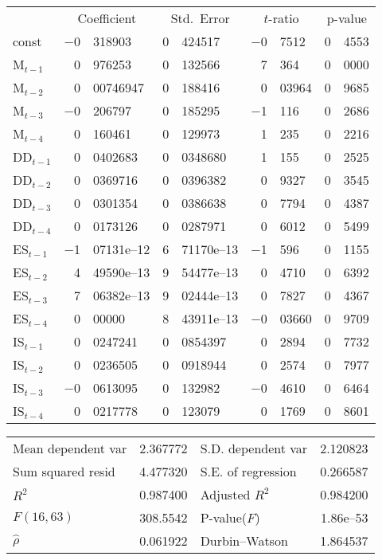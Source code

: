 \documentclass[11pt]{article}
\begin{document}
\begin{center}
\begin{tabular}{lr@{.}lr@{.}lr@{.}lr@{.}l}
  &
 \multicolumn{2}{c}{Coefficient} &
  \multicolumn{2}{c}{Std.\ Error} &
   \multicolumn{2}{c}{$t$-ratio} &
    \multicolumn{2}{c}{p-value} \\[1ex]
const &
  $-$0&318903 &
    0&424517 &
      $-$0&7512 &
        0&4553 \\
M$_{t-1}$ &
  0&976253 &
    0&132566 &
      7&364 &
        0&0000 \\
M$_{t-2}$ &
  0&00746947 &
    0&188416 &
      0&03964 &
        0&9685 \\
M$_{t-3}$ &
  $-$0&206797 &
    0&185295 &
      $-$1&116 &
        0&2686 \\
M$_{t-4}$ &
  0&160461 &
    0&129973 &
      1&235 &
        0&2216 \\
DD$_{t-1}$ &
  0&0402683 &
    0&0348680 &
      1&155 &
        0&2525 \\
DD$_{t-2}$ &
  0&0369716 &
    0&0396382 &
      0&9327 &
        0&3545 \\
DD$_{t-3}$ &
  0&0301354 &
    0&0386638 &
      0&7794 &
        0&4387 \\
DD$_{t-4}$ &
  0&0173126 &
    0&0287971 &
      0&6012 &
        0&5499 \\
ES$_{t-1}$ &
  $-$1&07131\textrm{e--12} &
    6&71170\textrm{e--13} &
      $-$1&596 &
        0&1155 \\
ES$_{t-2}$ &
  4&49590\textrm{e--13} &
    9&54477\textrm{e--13} &
      0&4710 &
        0&6392 \\
ES$_{t-3}$ &
  7&06382\textrm{e--13} &
    9&02444\textrm{e--13} &
      0&7827 &
        0&4367 \\
ES$_{t-4}$ &
  0&00000 &
    8&43911\textrm{e--13} &
      $-$0&03660 &
        0&9709 \\
IS$_{t-1}$ &
  0&0247241 &
    0&0854397 &
      0&2894 &
        0&7732 \\
IS$_{t-2}$ &
  0&0236505 &
    0&0918944 &
      0&2574 &
        0&7977 \\
IS$_{t-3}$ &
  $-$0&0613095 &
    0&132982 &
      $-$0&4610 &
        0&6464 \\
IS$_{t-4}$ &
  0&0217778 &
    0&123079 &
      0&1769 &
        0&8601 \\
\end{tabular}

\vspace{1ex}
\begin{tabular}{lrlr}
Mean dependent var &  2.367772 & S.D. dependent var &  2.120823 \\
Sum squared resid &  4.477320 & S.E. of regression &  0.266587 \\
$R^2$ &  0.987400 & Adjusted $R^2$ &  0.984200 \\
$F(16, 63)$ &  308.5542 & P-value($F$) &  1.86\textrm{e--53} \\
$\hat{\rho}$ &  0.061922 & Durbin--Watson &  1.864537 \\
\end{tabular}


\end{center}
\end{document}
